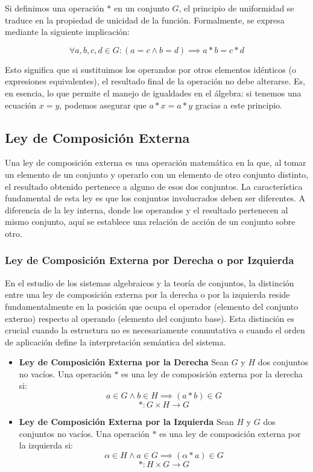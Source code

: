 \documentclass{article}
\begin{document}
Si definimos una operación $\ast$ en un conjunto $G$, el principio de uniformidad se traduce en la propiedad de unicidad de la función. Formalmente, se expresa mediante la siguiente implicación:

\[ \forall a, b, c, d \in G : (a = c \land b = d) \implies a \ast b = c \ast d \]

Esto significa que si sustituimos los operandos por otros elementos idénticos (o expresiones equivalentes), el resultado final de la operación no debe alterarse. Es, en esencia, lo que permite el manejo de igualdades en el álgebra: si tenemos una ecuación $x = y$, podemos asegurar que $a \ast x = a \ast y$ gracias a este principio.

\subsection{Ley de Composición Externa} 
\label{sec:leyes_de_composicion_externa}

Una ley de composición externa es una operación matemática en la que, al tomar un elemento de un conjunto y operarlo con un elemento de otro conjunto distinto, el resultado obtenido pertenece a alguno de esos dos conjuntos. La característica fundamental de esta ley es que los conjuntos involucrados deben ser diferentes. A diferencia de la ley interna, donde los operandos y el resultado pertenecen al mismo conjunto, aquí se establece una relación de acción de un conjunto sobre otro.

\subsubsection{Ley de Composición Externa por Derecha o por Izquierda}

En el estudio de los sistemas algebraicos y la teoría de conjuntos, la distinción entre una ley de composición externa por la derecha o por la izquierda reside fundamentalmente en la posición que ocupa el operador (elemento del conjunto externo) respecto al operando (elemento del conjunto base). Esta distinción es crucial cuando la estructura no es necesariamente conmutativa o cuando el orden de aplicación define la interpretación semántica del sistema.
\bigskip
\begin{itemize}

\item \textbf{Ley de Composición Externa por la Derecha}
Sean $G$ y $H$ dos conjuntos no vacíos. Una operación $\ast$ es una ley de composición externa por la derecha si:
\[ a \in G \land b \in H \implies (a \ast b) \in G \]
\[ \ast : G \times H \to G \]

\item \textbf{Ley de Composición Externa por la Izquierda}
Sean $H$ y $G$ dos conjuntos no vacíos. Una operación $\ast$ es una ley de composición externa por la izquierda si:
\[ \alpha \in H \land a \in G \implies (\alpha \ast a) \in G \]
\[ \ast : H \times G \to G \]
\end{itemize}
\end{document}
